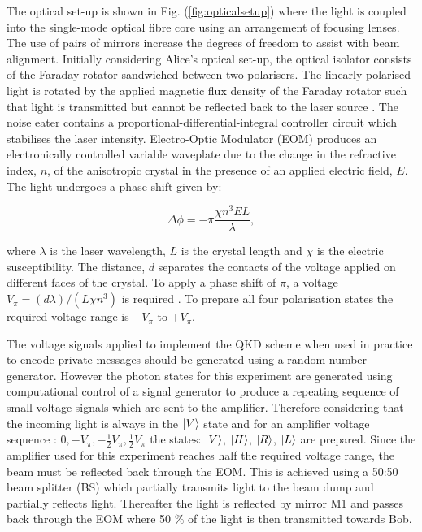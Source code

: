 The optical set-up is shown in Fig. (\ref{fig:opticalsetup}) where the light is coupled into the single-mode optical fibre core using an arrangement of focusing lenses. The use of pairs of mirrors increase the degrees of freedom to assist with beam alignment. Initially considering Alice's optical set-up, the optical isolator consists of the Faraday rotator sandwiched between two polarisers. The linearly polarised light is rotated by the applied magnetic flux density of the Faraday rotator such that light is transmitted but cannot be reflected back to the laser source \citep{Saleh2007FundamentalsPhotonics}. The noise eater contains a proportional-differential-integral controller circuit which stabilises the laser intensity. Electro-Optic Modulator (EOM) produces an electronically controlled variable waveplate due to the change in the refractive index, $n$, of the anisotropic crystal in the presence of an applied electric field, $E$. The light undergoes a phase shift given by:

\begin{equation}
\label{eq:interactionham0}
\Delta\phi = -\pi \frac{\chi n^{3}EL}{\lambda },
\end{equation}

where $\lambda$ is the laser wavelength, $L$ is the crystal length and $\chi$ is the electric susceptibility. The distance, $d$ separates the contacts of the voltage applied on different faces of the crystal. To apply a phase shift of $\pi$, a voltage $V_{\pi}=(d\lambda)/(L\chi n^{3})$ is required \citep{Saleh2007FundamentalsPhotonics,Iizuka2002ElementsMedia}. To prepare all four polarisation states the required voltage range is $-V_{\pi}$ to $+V_{\pi}$. 

The voltage signals applied to implement the QKD scheme when used in practice to encode private messages should be generated using a random number generator. However the photon states for this experiment are generated using computational control of a signal generator to produce a repeating sequence of small voltage signals which are sent to the amplifier. Therefore considering that the incoming light is always in the $\lvert V\rangle$ state and for an amplifier voltage sequence : $0, -V_{\pi},-\frac{1}{2}V_{\pi}, \frac{1}{2}V_{\pi}$ the states: $\lvert V\rangle$, $\lvert H\rangle$, $\lvert R\rangle$, $\lvert L\rangle$ are prepared. Since the amplifier used for this experiment reaches half the required voltage range, the beam must be reflected back through the EOM. This is achieved using a 50:50 beam splitter (BS) which partially transmits light to the beam dump and partially reflects light. Thereafter the light is reflected by mirror M1 and passes back through the EOM where 50 $\%$ of the light is then transmitted towards Bob. 

